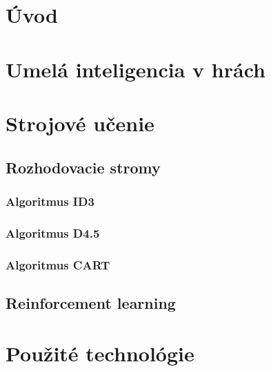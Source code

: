 \documentclass[slovak, master]{diploma}
\begin{document}
\MakeTitlePages

\listoffigures
\clearpage

\listoftables
\clearpage

\lstlistoflistings
\clearpage

\chapter{Úvod}
\label{sec:Introduction}


\chapter{Umelá inteligencia v hrách}
\label{sec:AI in games}

\chapter{Strojové učenie}
\label{sec:MachineLearningOverview}

\section{Rozhodovacie stromy}
\label{sec:DecisionTreesOverview}
\subsection{Algoritmus ID3}
\label{sec:ID3}
\subsection{Algoritmus D4.5}
\label{sec:D45}
\subsection{Algoritmus CART}
\label{sec:CART}

\section{Reinforcement learning}
\label{sec:ReinforcemenLearningOverview}


\chapter{Použité technológie}
\label{sec:Tech}
\end{document}
